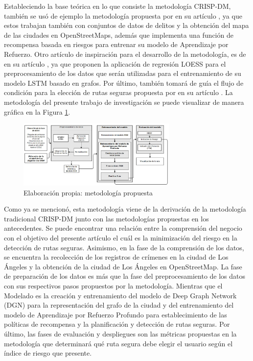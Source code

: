 Estableciendo la base teórica en lo que consiste la metodología CRISP-DM, también se usó de ejemplo la metodología propuesta por \citeauthor{pr_saferoute} en su artículo , ya que estos trabajan también con conjuntos de datos de delitos y la obtención del mapa de las ciudades en OpenStreetMaps, además que implementa una función de recompensa basada en riesgos para entrenar su modelo de Aprendizaje por Refuerzo. Otro artículo de inspiración para el desarrollo de la metodología, es de \citeauthor{pr_esquivel} en su artículo , ya que proponen la aplicación de regresión LOESS para el preprocesamiento de los datos que serán utilizadas para el entrenamiento de su modelo LSTM basado en grafos. Por último, también tomará de guía el flujo de condición para la elección de rutas seguras propuesta por \citeauthor{pr_Soni} en su artículo . La metodología del presente trabajo de investigación se puede visualizar de manera gráfica en la Figura \ref{1:mark}.\medskip

\begin{figure}[h]
	\begin{center}
		\includegraphics[width=0.7\textwidth]{3/figures/metopropuesta.jpg}
		\caption[Elaboración propia: Metodología propuesta]{Elaboración propia: metodología propuesta}
		\label{1:mark}
	\end{center}
\end{figure}
\medskip
Como ya se mencionó, esta metodología viene de la derivación de la metodología tradicional CRISP-DM junto con las metodologías propuestas en los antecedentes. Se puede encontrar una relación entre la comprensión del negocio con el objetivo del presente artículo el cuál es la minimización del riesgo en la detección de rutas seguras. Asimismo, en la fase de la comprensión de los datos, se encuentra la recolección de los registros de crímenes en la ciudad de Los Ángeles y la obtención de la ciudad de Los Ángeles en OpenStreetMap. La fase de preparación de los datos es más que la fase del preprocesamiento de los datos con sus respectivos pasos propuestos por la metodología. Mientras que el Modelado es la creación y entrenamiento del modelo de Deep Graph Network (DGN) para la representación del grafo de la ciudad y del entrenamiento del modelo de Aprendizaje por Refuerzo Profundo para establecimiento de las políticas de recompensa y la planificación y detección de rutas seguras. Por último, las fases de evaluación y despliegues son las métricas propuestas en la metodología que determinará qué ruta segura debe elegir el usuario según el índice de riesgo que presente.
